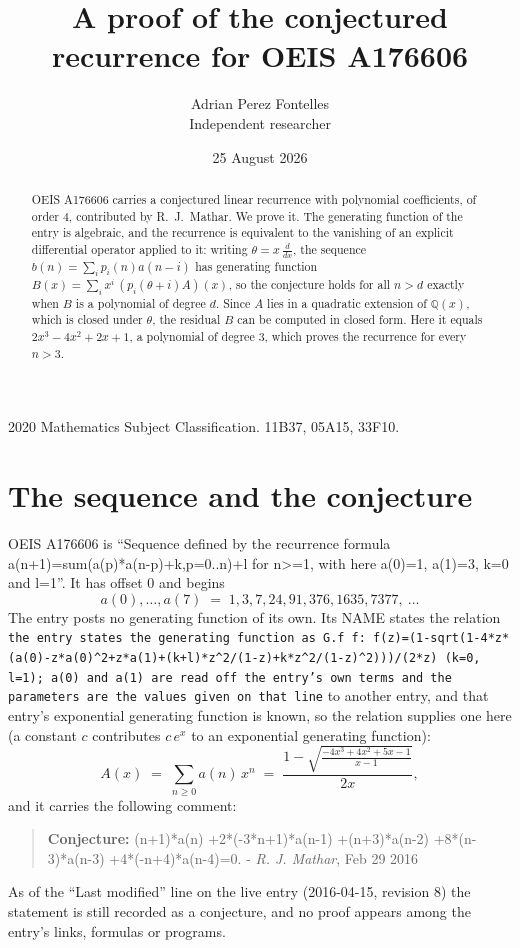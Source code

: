 \documentclass[11pt,a4paper]{article}
\title{A proof of the conjectured recurrence for OEIS A176606}
\author{Adrian Perez Fontelles\\ \small Independent researcher}
\date{25 August 2026}
\theoremstyle{plain}
\theoremstyle{definition}
\begin{document}
\maketitle

\begin{abstract}
OEIS A176606 carries a conjectured linear recurrence with polynomial coefficients, of
order 4, contributed by R.~J.~Mathar. We prove it. The generating function of the
entry is algebraic, and the recurrence is equivalent to the vanishing of an explicit
differential operator applied to it: writing $\theta=x\,\frac{d}{dx}$, the sequence
$b(n)=\sum_{i}p_{i}(n)a(n-i)$ has generating function
$B(x)=\sum_{i}x^{i}\,(p_{i}(\theta+i)A)(x)$, so the conjecture holds for all $n>d$ exactly
when $B$ is a polynomial of degree $d$. Since $A$ lies in a quadratic extension of
$\mathbb{Q}(x)$, which is closed under $\theta$, the residual $B$ can be computed in
closed form. Here it equals $2 x^{3} - 4 x^{2} + 2 x + 1$, a polynomial of degree $3$, which proves
the recurrence for every $n>3$.
\end{abstract}

\noindent\small 2020 Mathematics Subject Classification. 11B37, 05A15, 33F10.\normalsize

\section{The sequence and the conjecture}

OEIS A176606 is ``Sequence defined by the recurrence formula a(n+1)=sum(a(p)*a(n-p)+k,p=0..n)+l for n>=1, with here a(0)=1, a(1)=3, k=0 and l=1''. It has offset $0$ and begins
\[
a(0),\dots,a(7)\;=\;1, 3, 7, 24, 91, 376, 1635, 7377,\ \dots
\]
The entry posts no generating function of its own. Its NAME states the
relation \texttt{the entry states the generating function as G.f f: f(z)=(1-sqrt(1-4*z*(a(0)-z*a(0)\textasciicircum{}2+z*a(1)+(k+l)*z\textasciicircum{}2/(1-z)+k*z\textasciicircum{}2/(1-z)\textasciicircum{}2)))/(2*z) (k=0, l=1); a(0) and a(1) are read off the entry's own terms and the parameters are the values given on that line} to another entry, and that entry's exponential generating
function is known, so the relation supplies one here (a constant $c$ contributes
$c\,e^{x}$ to an exponential generating function):
\begin{equation}\label{eq:gf}
A(x)\;=\;\sum_{n\ge 0} a(n)\,x^{n}\;=\;\frac{1 - \sqrt{\frac{- 4 x^{3} + 4 x^{2} + 5 x - 1}{x - 1}}}{2 x} ,
\end{equation}
and it carries the following comment:
\begin{quote}\small
\textbf{Conjecture:} (n+1)*a(n) +2*(-3*n+1)*a(n-1) +(n+3)*a(n-2) +8*(n-3)*a(n-3) +4*(-n+4)*a(n-4)=0. - \emph{R. J. Mathar}, Feb 29 2016
\end{quote}
As of the ``Last modified'' line on the live entry (2016-04-15, revision 8) the
statement is still recorded as a conjecture, and no proof appears among the entry's links,
formulas or programs.
\end{document}
